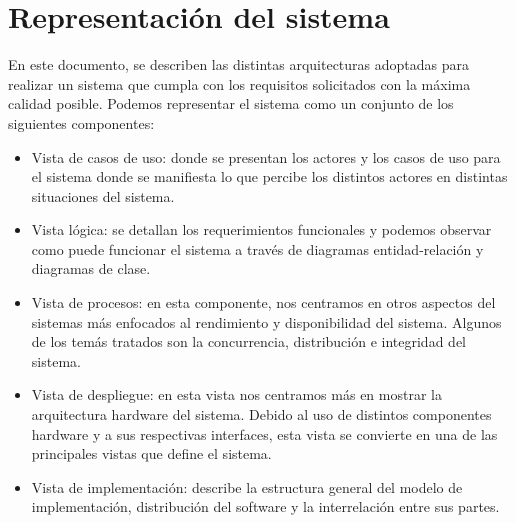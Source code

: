 \chapter{Representaci\'on del sistema}
En este documento, se describen las distintas arquitecturas adoptadas para realizar un sistema que cumpla con los requisitos solicitados con la m\'axima calidad posible. Podemos representar el sistema como un conjunto de los siguientes componentes:
 \begin{itemize}
 \item Vista de casos de uso: donde se presentan los actores y los casos de uso para el sistema donde se manifiesta lo que percibe los distintos actores en distintas situaciones del sistema. 
 \item Vista l\'ogica: se detallan los requerimientos funcionales y podemos observar como puede funcionar el sistema a trav\'es de diagramas entidad-relaci\'on y diagramas de clase.
 \item Vista de procesos: en esta componente, nos centramos en otros aspectos del sistemas m\'as enfocados al rendimiento y disponibilidad del sistema. Algunos de los tem\'as tratados son la concurrencia, distribuci\'on e integridad del sistema.
 \item Vista de despliegue: en esta vista nos centramos m\'as en mostrar la arquitectura hardware del sistema. Debido al uso de distintos componentes hardware y a sus respectivas interfaces, esta vista se convierte en una de las principales vistas que define el sistema.
 \item Vista de implementaci\'on: describe la estructura general del modelo de implementaci\'on, distribuci\'on del software y la interrelaci\'on entre sus partes.
 \end{itemize}
